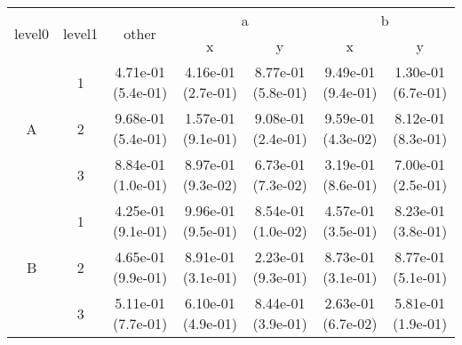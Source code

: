 \begin{tabular}{ccccccc}
\toprule
\multirow{2}{*}{level0} & \multirow{2}{*}{level1}& \multirow{2}{*}{other}&\multicolumn{2}{c}{a}&\multicolumn{2}{c}{b}\tabularnewline
\cmidrule(lr){4-5}
\cmidrule(lr){6-7}
&&&x&y&x&y\tabularnewline
\midrule
\multirow{3}{*}{A}&1& 4.71e-01 (5.4e-01)& 4.16e-01 (2.7e-01)& 8.77e-01 (5.8e-01)& 9.49e-01 (9.4e-01)& 1.30e-01 (6.7e-01)\tabularnewline
&2& 9.68e-01 (5.4e-01)& 1.57e-01 (9.1e-01)& 9.08e-01 (2.4e-01)& 9.59e-01 (4.3e-02)& 8.12e-01 (8.3e-01)\tabularnewline
&3& 8.84e-01 (1.0e-01)& 8.97e-01 (9.3e-02)& 6.73e-01 (7.3e-02)& 3.19e-01 (8.6e-01)& 7.00e-01 (2.5e-01)\tabularnewline
\midrule
\multirow{3}{*}{B}&1& 4.25e-01 (9.1e-01)& 9.96e-01 (9.5e-01)& 8.54e-01 (1.0e-02)& 4.57e-01 (3.5e-01)& 8.23e-01 (3.8e-01)\tabularnewline
&2& 4.65e-01 (9.9e-01)& 8.91e-01 (3.1e-01)& 2.23e-01 (9.3e-01)& 8.73e-01 (3.1e-01)& 8.77e-01 (5.1e-01)\tabularnewline
&3& 5.11e-01 (7.7e-01)& 6.10e-01 (4.9e-01)& 8.44e-01 (3.9e-01)& 2.63e-01 (6.7e-02)& 5.81e-01 (1.9e-01)\tabularnewline
\bottomrule
\end{tabular}
